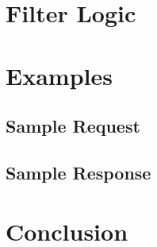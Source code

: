 \documentclass[12pt,a4paper]{article}
\begin{document}
\section{Filter Logic}

\section{Examples}

\subsection{Sample Request}

\subsection{Sample Response}

\section{Conclusion}
\end{document}
